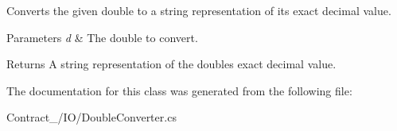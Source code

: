 Converts the given double to a string representation of its exact decimal value. 


\begin{DoxyParams}{Parameters}
{\em d} & The double to convert.\\
\hline
\end{DoxyParams}
\begin{DoxyReturn}{Returns}
A string representation of the double\textquotesingle{}s exact decimal value.
\end{DoxyReturn}


The documentation for this class was generated from the following file\+:\begin{DoxyCompactItemize}
\item 
Contract\+\_\+/\+I\+O/Double\+Converter.\+cs\end{DoxyCompactItemize}
